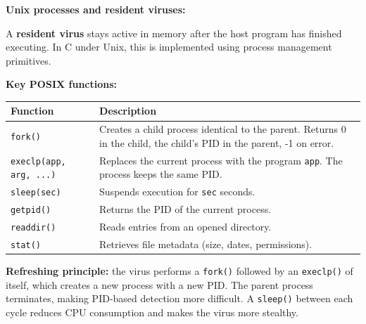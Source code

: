 \documentclass[a4paper,11pt]{article}
\theoremstyle{plain}
\theoremstyle{definition}
\begin{document}
\begin{rappel}
\textbf{Unix processes and resident viruses:}

A \textbf{resident virus} stays active in memory after the host program has finished executing. In C under Unix, this is implemented using process management primitives.

\medskip
\textbf{Key POSIX functions:}

\begin{center}
\begin{tabular}{lp{8cm}}
\toprule
\textbf{Function} & \textbf{Description} \\
\midrule
\texttt{fork()} & Creates a child process identical to the parent. Returns 0 in the child, the child's PID in the parent, -1 on error. \\
\texttt{execlp(app, arg, ...)} & Replaces the current process with the program \texttt{app}. The process keeps the same PID. \\
\texttt{sleep(sec)} & Suspends execution for \texttt{sec} seconds. \\
\texttt{getpid()} & Returns the PID of the current process. \\
\texttt{readdir()} & Reads entries from an opened directory. \\
\texttt{stat()} & Retrieves file metadata (size, dates, permissions). \\
\bottomrule
\end{tabular}
\end{center}

\medskip
\textbf{Refreshing principle:} the virus performs a \texttt{fork()} followed by an \texttt{execlp()} of itself, which creates a new process with a new PID. The parent process terminates, making PID-based detection more difficult. A \texttt{sleep()} between each cycle reduces CPU consumption and makes the virus more stealthy.
\end{rappel}
\end{document}

